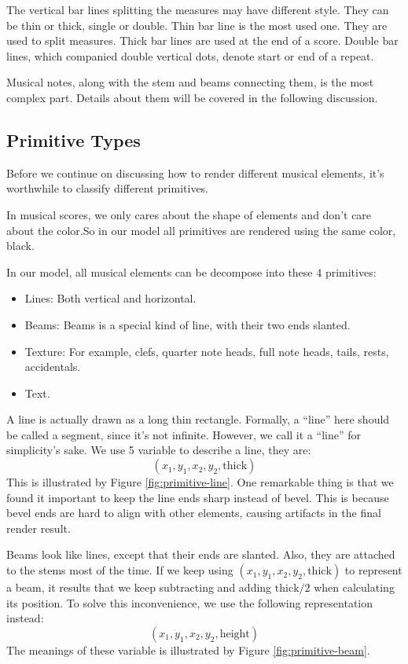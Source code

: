 The vertical bar lines splitting the measures may have different style. They can be thin or thick, single or double. Thin bar line is the most used one. They are used to split measures.
 Thick bar lines are used at the end of a score. Double bar lines, which companied double vertical dots, denote start or end of a repeat.

 Musical notes, along with the stem and beams connecting them, is the most complex part. Details about them will be covered in the following discussion.

\subsection{Primitive Types}
Before we continue on discussing how to render different musical elements, it's worthwhile to classify different primitives.

In musical scores, we only cares about the shape of elements and don't care about the color.So in our model all primitives are rendered using the same color, black.

In our model, all musical elements can be decompose into these 4 primitives:
\begin{itemize}
    \item Lines: Both vertical and horizontal.
    \item Beams: Beams is a special kind of line, with their two ends slanted.
    \item Texture: For example, clefs, quarter note heads, full note heads, tails, rests, accidentals.
    \item Text.
\end{itemize}

A line is actually drawn as a long thin rectangle. Formally, a ``line'' here should be called a segment, since it's not infinite. However, we call it a ``line'' for simplicity's sake.
We use 5 variable to describe a line, they are:
    $$(x_1, y_1, x_2, y_2, \mathrm{thick})$$
This is illustrated by Figure \ref{fig:primitive-line}. One remarkable thing is that we found it important to keep the line ends sharp instead of bevel. This is because bevel ends are hard to align with other elements, causing artifacts in the final render result.

Beams look like lines, except that their ends are slanted. Also, they are attached to the stems most of the time. If we keep using $(x_1, y_1, x_2, y_2, \mathrm{thick})$ to represent a beam, it results that we keep subtracting and adding $\mathrm{thick} / 2$ when calculating
its position. To solve this inconvenience, we use the following representation instead:
\[
    (x_1, y_1, x_2, y_2, \mathrm{height})
\]
The meanings of these variable is illustrated by Figure \ref{fig:primitive-beam}.

